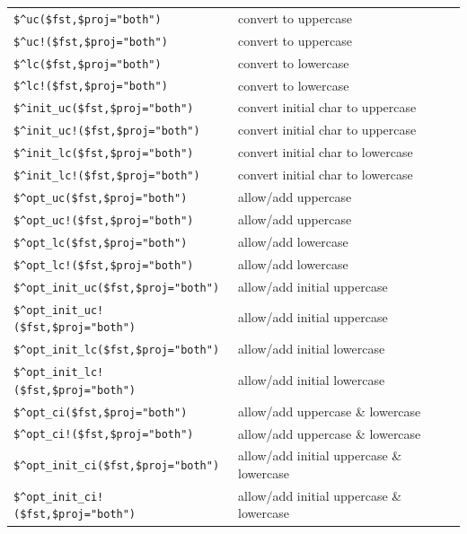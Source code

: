 \documentclass[letterpaper,12pt]{article}
\begin{document}
\vspace{0.5cm}

\noindent
\begin{tabular}{|l|l|}
\hline
\verb/$^uc($fst,/\verb!$proj="both"!\verb!)! & convert to uppercase\\
\verb/$^uc!($fst,/\verb!$proj="both"!\verb!)! & convert to uppercase\\
\verb/$^lc($fst,/\verb!$proj="both"!\verb!)! & convert to lowercase\\
\verb/$^lc!($fst,/\verb!$proj="both"!\verb!)! & convert to lowercase\\
\hline
\verb/$^init_uc($fst,/\verb!$proj="both"!\verb!)! & convert initial char to uppercase\\
\verb/$^init_uc!($fst,/\verb!$proj="both"!\verb!)! & convert initial char to uppercase\\
\verb/$^init_lc($fst,/\verb!$proj="both"!\verb!)! & convert initial char to lowercase\\
\verb/$^init_lc!($fst,/\verb!$proj="both"!\verb!)! & convert initial char to lowercase\\
\hline
\verb/$^opt_uc($fst,/\verb!$proj="both"!\verb!)! & allow/add uppercase\\
\verb/$^opt_uc!($fst,/\verb!$proj="both"!\verb!)! & allow/add uppercase\\
\verb/$^opt_lc($fst,/\verb!$proj="both"!\verb!)! & allow/add lowercase\\
\verb/$^opt_lc!($fst,/\verb!$proj="both"!\verb!)! & allow/add lowercase\\
\hline
\verb/$^opt_init_uc($fst,/\verb!$proj="both"!\verb!)! & allow/add initial uppercase\\
\verb/$^opt_init_uc!($fst,/\verb!$proj="both"!\verb!)! & allow/add initial uppercase\\
\verb/$^opt_init_lc($fst,/\verb!$proj="both"!\verb!)! & allow/add initial lowercase\\
\verb/$^opt_init_lc!($fst,/\verb!$proj="both"!\verb!)! & allow/add initial lowercase\\
\hline
\verb/$^opt_ci($fst,/\verb!$proj="both"!\verb!)! & allow/add uppercase \& lowercase\\
\verb/$^opt_ci!($fst,/\verb!$proj="both"!\verb!)! & allow/add uppercase \& lowercase\\
\verb/$^opt_init_ci($fst,/\verb!$proj="both"!\verb!)! & allow/add initial uppercase \& lowercase\\
\verb/$^opt_init_ci!($fst,/\verb!$proj="both"!\verb!)! & allow/add initial uppercase \& lowercase\\
\hline
\end{tabular}
\end{document}
